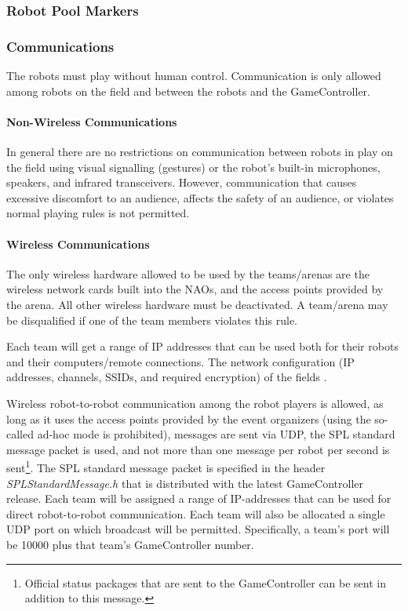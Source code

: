 \subsubsection{Robot Pool Markers}
\label{sec:robot_pool_markers}

\subsubsection{Communications}
\label{sec:communications}
The robots must play without human control. Communication is only allowed among robots on the field and between the robots and the GameController.

\paragraph{Non-Wireless Communications}
\label{sec:acoustic}
In general there are no restrictions on communication between robots in play on the field using visual signalling (\eg gestures) or the robot's built-in microphones, speakers, and infrared transceivers. However, communication that causes excessive discomfort to an audience, affects the safety of an audience, or violates normal playing rules is not permitted.

\paragraph{Wireless Communications}
\label{sec:wireless}
The only wireless hardware allowed to be used by the teams/arenas are the wireless network cards built into the NAOs, and the access points provided by the arena. All other wireless hardware must be deactivated. A team/arena may be disqualified if one of the team members violates this rule.

Each team will get a range of IP addresses that can be used both for their robots and their computers/remote connections. The network configuration (\eg IP addresses, channels, SSIDs, and required encryption) of the fields .

Wireless robot-to-robot communication among the robot players is allowed, as long as it uses the access points provided by the event organizers (using the so-called ad-hoc mode is prohibited), messages are sent via UDP, the SPL standard message packet is used, and not more than one message per robot per second is sent\footnote{Official status packages that are sent to the GameController can be sent in addition to this message.}. The SPL standard message packet is specified in the header \emph{SPLStandardMessage.h} that is distributed with the latest GameController release. Each team will be assigned a range of IP-addresses that can be used for direct robot-to-robot communication. Each team will also be allocated a single UDP port on which broadcast will be permitted.  Specifically, a team's port will be 10000 plus that team's GameController number.


